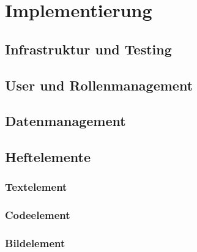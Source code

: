 \documentclass[a4paper,12pt,twoside,openany]{book}
\begin{document}
\newpage %

\section{Implementierung}
\label{sec:implementierung}


\subsection{Infrastruktur und Testing}
\label{subsec:infrastrukturtesting}


\newpage

\subsection{User und Rollenmanagement}
\label{subsec:usermanagement}


\newpage

\subsection{Datenmanagement}
\label{subsec:datenmanagement}


\newpage

\subsection{Heftelemente}
\label{subsec:heftelement}


\subsubsection{Textelement}
\label{subsubsec:textelement}


\newpage

\subsubsection{Codeelement}
\label{subsubsec:codeelement}


\newpage

\subsubsection{Bildelement}
\label{subsubsec:bildelement}

\end{document}
